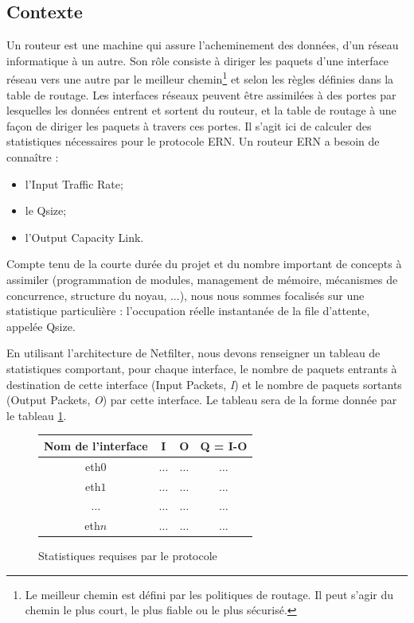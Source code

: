 \documentclass[a4paper]{article}
\begin{document}
\subsection{Contexte}
Un routeur est une machine qui assure l’acheminement des données,
d'un réseau informatique à un autre. Son rôle consiste à diriger
les paquets d'une interface réseau vers une autre par le meilleur chemin\footnote{Le meilleur chemin est défini par
les politiques de routage. Il peut s'agir du chemin le plus court, le plus fiable ou le plus sécurisé.} et selon les règles définies dans la table de
routage. 
Les interfaces réseaux peuvent être assimilées à des
portes par lesquelles les données entrent et sortent du routeur, et
la table de routage à une façon de diriger les paquets à travers
ces portes.
Il s'agit ici de calculer des statistiques nécessaires 
pour le protocole ERN. Un routeur ERN a besoin de connaître :
\begin{itemize}
	\item l'Input Traffic Rate;
	\item le Qsize;
	\item l'Output Capacity Link.
\end{itemize}
Compte tenu de la courte durée du projet et 
du nombre important de concepts à assimiler (programmation de modules,
management de mémoire, mécanismes de concurrence, structure du noyau, ...),
nous nous sommes focalisés sur une statistique particulière : l'occupation
réelle instantanée de la file d'attente, appelée Qsize.

En utilisant l'architecture de Netfilter, nous devons renseigner
un tableau de statistiques comportant, pour chaque interface, le
nombre de paquets entrants à destination de cette interface
(Input Packets, \textit{I}) et le nombre de paquets sortants
(Output Packets, \textit{O}) par cette interface. Le tableau sera de la forme donnée par le tableau \ref{stats}.
\begin{figure}[!ht]
	\centering
	\begin{tabular}{c|c|c|c}
		Nom de l'interface & I & O & Q = I-O \\
		\hline
		eth$0$ & $\ldots$ & $\ldots$ & $\ldots$ \\
		eth$1$ & $\ldots$ & $\ldots$ & $\ldots$ \\
		$\ldots$ & $\ldots$ & $\ldots$ & $\ldots$ \\
		eth$n$ & $\ldots$ & $\ldots$ & $\ldots$ \\
	\end{tabular}
	\caption{\label{stats} Statistiques requises par le protocole}
\end{figure}
\end{document}
